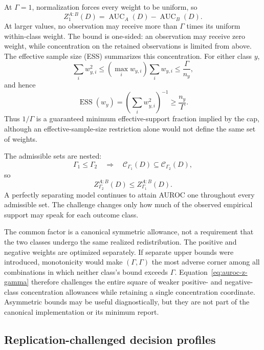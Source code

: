 \documentclass[11pt]{article}
\newcommand{\CSet}{\mathcal{C}}
\theoremstyle{remark}
\begin{document}
At $\Gamma=1$, normalization forces every weight to be uniform, so
\begin{equation}
Z_1^{A:B}(D)
=
\operatorname{AUC}_A(D)-\operatorname{AUC}_B(D).
\label{eq:auroc-gamma-one}
\end{equation}
At larger values, no observation may receive more than $\Gamma$ times its
uniform within-class weight. The bound is one-sided: an observation may receive
zero weight, while concentration on the retained observations is limited from
above. The effective sample size (ESS) summarizes this concentration. For
either class $y$,
\[
\sum_i w_{y,i}^2
\leq
\left(\max_i w_{y,i}\right)\sum_iw_{y,i}
\leq
\frac{\Gamma}{n_y},
\]
and hence
\begin{equation}
\operatorname{ESS}(w_y)
=
\left(\sum_iw_{y,i}^2\right)^{-1}
\geq
\frac{n_y}{\Gamma}.
\label{eq:auroc-gamma-ess}
\end{equation}
Thus $1/\Gamma$ is a guaranteed minimum effective-support fraction implied by
the cap, although an effective-sample-size restriction alone would not define
the same set of weights.

The admissible sets are nested:
\[
\Gamma_1\leq\Gamma_2
\quad\Longrightarrow\quad
\CSet_{\Gamma_1}(D)\subseteq\CSet_{\Gamma_2}(D),
\]
so
\begin{equation}
Z_{\Gamma_2}^{A:B}(D)
\leq
Z_{\Gamma_1}^{A:B}(D).
\label{eq:auroc-gamma-monotone}
\end{equation}
A perfectly separating model continues to attain AUROC one throughout every
admissible set. The challenge changes only how much of the observed empirical
support may speak for each outcome class.

The common factor is a canonical symmetric allowance, not a requirement that
the two classes undergo the same realized redistribution. The positive and
negative weights are optimized separately. If separate upper bounds were
introduced, monotonicity would make $(\Gamma,\Gamma)$ the most adverse corner
among all combinations in which neither class's bound exceeds $\Gamma$.
Equation~\eqref{eq:auroc-z-gamma} therefore challenges the entire square of
weaker positive- and negative-class concentration allowances while retaining a
single concentration coordinate. Asymmetric bounds may be useful diagnostically,
but they are not part of the canonical implementation or its minimum report.

\subsection{Replication-challenged decision profiles}
\end{document}
